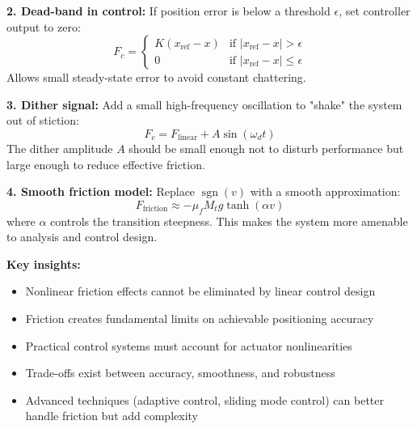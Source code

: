 \documentclass[11pt,a4paper]{article}
\begin{document}
\textbf{2. Dead-band in control:}
If position error is below a threshold $\epsilon$, set controller output to zero:
\[
F_c = \begin{cases}
K(x_{\text{ref}} - x) & \text{if } |x_{\text{ref}} - x| > \epsilon \\
0 & \text{if } |x_{\text{ref}} - x| \leq \epsilon
\end{cases}
\]
Allows small steady-state error to avoid constant chattering.

\textbf{3. Dither signal:}
Add a small high-frequency oscillation to "shake" the system out of stiction:
\[
F_c = F_{\text{linear}} + A\sin(\omega_d t)
\]
The dither amplitude $A$ should be small enough not to disturb performance but large enough to reduce effective friction.

\textbf{4. Smooth friction model:}
Replace $\operatorname{sgn}(v)$ with a smooth approximation:
\[
F_{\text{friction}} \approx -\mu_f M_t g \tanh(\alpha v)
\]
where $\alpha$ controls the transition steepness. This makes the system more amenable to analysis and control design.

\textbf{Key insights:}
\begin{itemize}
\item Nonlinear friction effects cannot be eliminated by linear control design
\item Friction creates fundamental limits on achievable positioning accuracy
\item Practical control systems must account for actuator nonlinearities
\item Trade-offs exist between accuracy, smoothness, and robustness
\item Advanced techniques (adaptive control, sliding mode control) can better handle friction but add complexity
\end{itemize}
\end{document}
